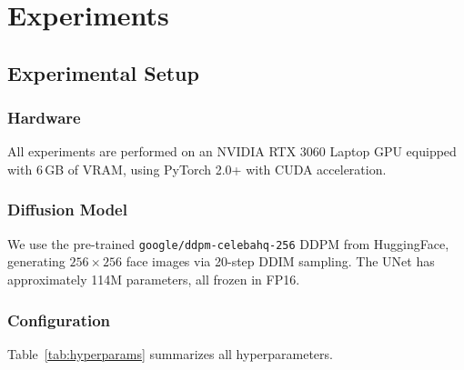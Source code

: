 \documentclass[conference]{IEEEtran}
\begin{document}
\section{Experiments}
\label{sec:experiments}

\subsection{Experimental Setup}
\label{sec:setup}

\subsubsection{Hardware}
All experiments are performed on an NVIDIA RTX 3060 Laptop GPU equipped with 6\,GB of VRAM, using PyTorch 2.0+ with CUDA acceleration.

\subsubsection{Diffusion Model}
We use the pre-trained \texttt{google/ddpm-celebahq-256} DDPM from HuggingFace, generating $256\times256$ face images via 20-step DDIM sampling.
The UNet has approximately 114M parameters, all frozen in FP16.

\subsubsection{Configuration}
Table~\ref{tab:hyperparams} summarizes all hyperparameters.
\end{document}
